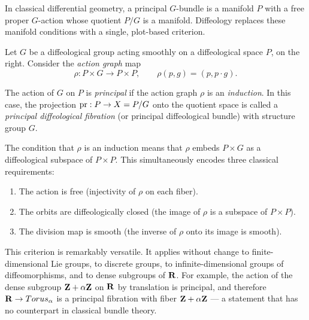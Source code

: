   \begin{article}
    \label{art:Principal Diffeological Fiber Bundles}
    
    In classical differential geometry,
    a principal $G$-bundle is a manifold $P$ with a free proper $G$-action
    whose quotient $P/G$ is a manifold.
    Diffeology replaces these manifold conditions with a single,
    plot-based criterion.
    
    Let $G$ be a diffeological group acting smoothly on a diffeological space $P$,
    on the right.
    Consider the \emph{action graph} map
    \[
      \rho: P \times G \to P \times P,
      \qquad
      \rho(p,g) = (p, p \cdot g).
      \]
    
    \begin{definition}
      The action of $G$ on $P$ is \emph{principal} if the action graph $\rho$
      is an \emph{induction}.
      In this case,
      the projection $\pr: P \to X = P/G$ onto the quotient space
      is called a \emph{principal diffeological fibration}
      (or principal diffeological bundle) with structure group $G$.
    \end{definition}
    
    The condition that $\rho$ is an induction means that $\rho$ embeds
    $P \times G$ as a diffeological subspace of $P \times P$.
    This simultaneously encodes three classical requirements:
    \begin{enumerate}
      \item The action is free (injectivity of $\rho$ on each fiber).
      \item The orbits are diffeologically closed (the image of $\rho$
      is a subspace of $P \times P$).
      \item The division map is smooth (the inverse of $\rho$ onto its image
      is smooth).
    \end{enumerate}
    
    This criterion is remarkably versatile.
    It applies without change to finite-dimensional Lie groups,
    to discrete groups,
    to infinite-dimensional groups of diffeomorphisms,
    and to dense subgroups of ${\mathbf{R}}$.
    For example,
    the action of the dense subgroup ${\mathbf{Z}} + \alpha{\mathbf{Z}}$ on ${\mathbf{R}}$ by translation
    is principal,
    and therefore ${\mathbf{R}} \to Torus_\alpha$ is a principal fibration with fiber
    ${\mathbf{Z}} + \alpha{\mathbf{Z}}$ —
    a statement that has no counterpart in classical bundle theory.
    

\end{article}
